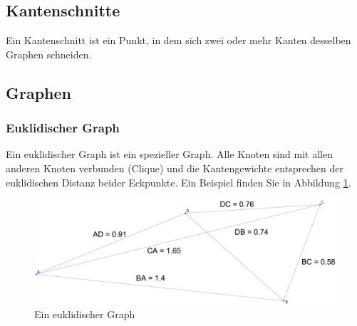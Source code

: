 \documentclass[a4paper,twoside]{IEEEtran}
\begin{document}
\subsection{Kantenschnitte} \label{Kantenschnitt}
Ein Kantenschnitt ist ein Punkt, in dem sich zwei oder mehr Kanten desselben Graphen schneiden.





\subsection{Graphen}
\subsubsection{Euklidischer Graph}
Ein euklidischer Graph ist ein spezieller Graph. 
Alle Knoten sind mit allen anderen Knoten verbunden (Clique) und die Kantengewichte entsprechen der euklidischen Distanz beider Eckpunkte. 
Ein Beispiel finden Sie in Abbildung \ref{fig:Graph}.
\begin{figure}[h!]
\centering
\includegraphics[width=0.99\linewidth]{Graph.eps}
\caption{Ein euklidischer Graph}
\label{fig:Graph}
\end{figure}
\end{document}
